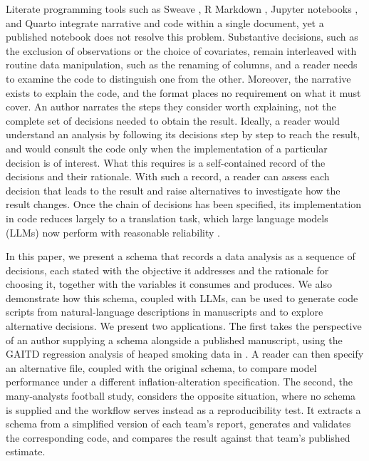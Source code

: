 \documentclass[aoas]{imsart}
\begin{document}
Literate programming tools such as Sweave \citep{Leisch2002}, R Markdown
\citep{xie2018rmarkdown}, Jupyter notebooks \citep{jupyter}, and Quarto
\citep{Allaire_Quarto_2026} integrate narrative and code within a single
document, yet a published notebook does not resolve this problem.
Substantive decisions, such as the exclusion of observations or the
choice of covariates, remain interleaved with routine data manipulation,
such as the renaming of columns, and a reader needs to examine the code
to distinguish one from the other. Moreover, the narrative exists to
explain the code, and the format places no requirement on what it must
cover. An author narrates the steps they consider worth explaining, not
the complete set of decisions needed to obtain the result. Ideally, a
reader would understand an analysis by following its decisions step by
step to reach the result, and would consult the code only when the
implementation of a particular decision is of interest. What this
requires is a self-contained record of the decisions and their
rationale. With such a record, a reader can assess each decision that
leads to the result and raise alternatives to investigate how the result
changes. Once the chain of decisions has been specified, its
implementation in code reduces largely to a translation task, which
large language models (LLMs) now perform with reasonable reliability
\citep{chen2021codex, huang_executionbased_2022, lai_ds1000_2023, jiang2026survey, shah_automating_2026}.

In this paper, we present a schema that records a data analysis as a
sequence of decisions, each stated with the objective it addresses and
the rationale for choosing it, together with the variables it consumes
and produces. We also demonstrate how this schema, coupled with LLMs,
can be used to generate code scripts from natural-language descriptions
in manuscripts and to explore alternative decisions. We present two
applications. The first takes the perspective of an author supplying a
schema alongside a published manuscript, using the GAITD regression
analysis of heaped smoking data in \citet{yee2025heaping}. A reader can
then specify an alternative file, coupled with the original schema, to
compare model performance under a different inflation-alteration
specification. The second, the many-analysts football study, considers
the opposite situation, where no schema is supplied and the workflow
serves instead as a reproducibility test. It extracts a schema from a
simplified version of each team's report, generates and validates the
corresponding code, and compares the result against that team's
published estimate.
\end{document}
